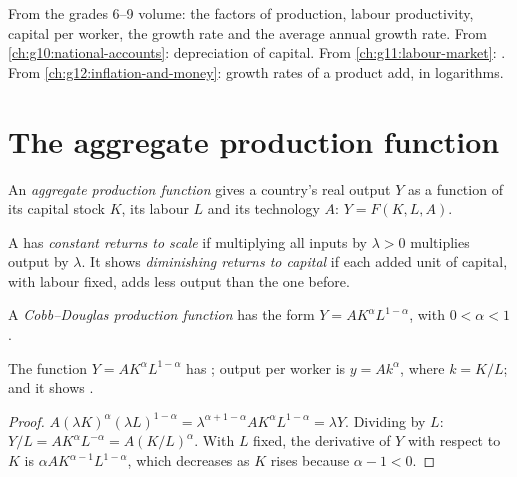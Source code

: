 \begin{recall}
From the grades 6--9 volume: the factors of production, labour productivity, capital per worker, the growth rate and the average annual growth rate. From
\cref{ch:g10:national-accounts}: depreciation of capital. From \cref{ch:g11:labour-market}: . From \cref{ch:g12:inflation-and-money}: growth rates of a
product add, in logarithms.
\end{recall}

\section{The aggregate production function}\label{sec:g12:growth-and-production-function:apf}

\begin{definition}\label{def:g12:growth-and-production-function:apf}
An \emph{aggregate production function} gives a country's real output $Y$ as a function of its capital stock $K$, its labour $L$ and
its technology $A$: $Y = F(K, L, A)$.
\end{definition}

\begin{definition}\label{def:g12:growth-and-production-function:crs}
A  has \emph{constant returns to scale} if multiplying all inputs by $\lambda > 0$ multiplies output by $\lambda$. It
shows \emph{diminishing returns to capital}\label{def:g12:growth-and-production-function:diminishing-returns} if each
added unit of capital, with labour fixed, adds less output than the one before.
\end{definition}

\begin{definition}\label{def:g12:growth-and-production-function:cobb-douglas}
A \emph{Cobb--Douglas production function} has the form $Y = AK^{\alpha}L^{1 - \alpha}$, with $0 < \alpha < 1$.
\end{definition}

\begin{proposition}\label{prop:g12:growth-and-production-function:cd}
The function $Y = AK^{\alpha}L^{1 - \alpha}$ has ; output per worker is $y = Ak^{\alpha}$, where $k = K/L$; and it shows .
\end{proposition}
\begin{proof}
$A(\lambda K)^{\alpha}(\lambda L)^{1 - \alpha} = \lambda^{\alpha + 1 - \alpha}AK^{\alpha}L^{1 - \alpha} = \lambda Y$. Dividing by $L$: $Y/L = AK^{\alpha}L^{-\alpha} = A(K/L)^{\alpha}$.
With $L$ fixed, the derivative of $Y$ with respect to $K$ is $\alpha AK^{\alpha - 1}L^{1 - \alpha}$, which decreases as $K$ rises because $\alpha - 1 < 0$.
\end{proof}

